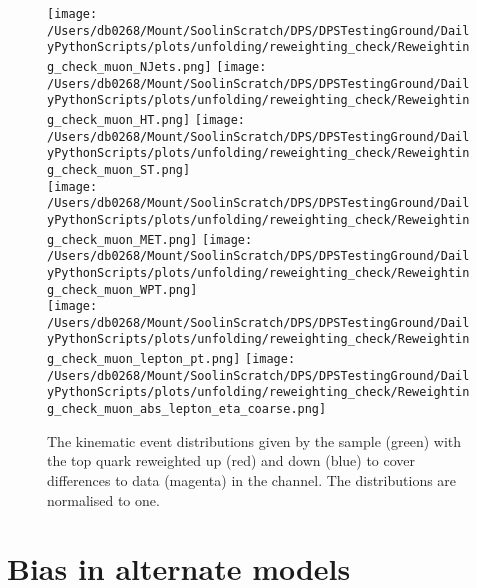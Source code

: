 \begin{figure*}[htpb]
	\centering
	\texttt{[image: /Users/db0268/Mount/SoolinScratch/DPS/DPSTestingGround/DailyPythonScripts/plots/unfolding/reweighting\_check/Reweighting\_check\_muon\_NJets.png]} 
	\texttt{[image: /Users/db0268/Mount/SoolinScratch/DPS/DPSTestingGround/DailyPythonScripts/plots/unfolding/reweighting\_check/Reweighting\_check\_muon\_HT.png]} 
	\texttt{[image: /Users/db0268/Mount/SoolinScratch/DPS/DPSTestingGround/DailyPythonScripts/plots/unfolding/reweighting\_check/Reweighting\_check\_muon\_ST.png]} \\
	\texttt{[image: /Users/db0268/Mount/SoolinScratch/DPS/DPSTestingGround/DailyPythonScripts/plots/unfolding/reweighting\_check/Reweighting\_check\_muon\_MET.png]} 
	\texttt{[image: /Users/db0268/Mount/SoolinScratch/DPS/DPSTestingGround/DailyPythonScripts/plots/unfolding/reweighting\_check/Reweighting\_check\_muon\_WPT.png]} \\
	\texttt{[image: /Users/db0268/Mount/SoolinScratch/DPS/DPSTestingGround/DailyPythonScripts/plots/unfolding/reweighting\_check/Reweighting\_check\_muon\_lepton\_pt.png]} 
	\texttt{[image: /Users/db0268/Mount/SoolinScratch/DPS/DPSTestingGround/DailyPythonScripts/plots/unfolding/reweighting\_check/Reweighting\_check\_muon\_abs\_lepton\_eta\_coarse.png]} \\
	\caption[The kinematic event distributions given by the \powhegpythia{} sample (green) with the top quark \pt{} reweighted up (red) and down (blue) to cover differences to data (magenta) in the \muJets{} channel. The distributions are normalised to one.]{The kinematic event distributions given by the \powhegpythia{} sample (green) with the top quark \pt{} reweighted up (red) and down (blue) to cover differences to data (magenta) in the \muJets{} channel. The distributions are normalised to one.}
	\label{fig:Reweightmu}
\end{figure*}


\chapter{Bias in alternate models} %
\label{ch:bias_in_alternate_models}

